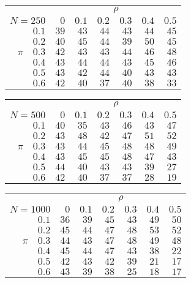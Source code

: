 \begin{tabular}{r|rrrrrr}
\hline\hline
 &\multicolumn{6}{c}{$\rho$} \\ 
 $N = 250$ & $0$ & $0.1$ & $0.2$ & $0.3$ & $0.4$ & $0.5$ \\ 
 \hline$0.1$ & $39$ & $43$ & $44$ & $43$ & $44$ & $45$\\ 
$0.2$ & $40$ & $45$ & $44$ & $39$ & $50$ & $45$\\ 
$\pi\quad$$0.3$ & $42$ & $43$ & $43$ & $44$ & $46$ & $48$\\ 
$0.4$ & $43$ & $44$ & $44$ & $43$ & $45$ & $46$\\ 
$0.5$ & $43$ & $42$ & $44$ & $40$ & $43$ & $43$\\ 
$0.6$ & $42$ & $40$ & $37$ & $40$ & $38$ & $33$\\ 
 \hline 
 \end{tabular}
 
 \vspace{2em} 
 
\begin{tabular}{r|rrrrrr}
\hline\hline
 &\multicolumn{6}{c}{$\rho$} \\ 
 $N = 500$ & $0$ & $0.1$ & $0.2$ & $0.3$ & $0.4$ & $0.5$ \\ 
 \hline$0.1$ & $40$ & $35$ & $43$ & $46$ & $43$ & $47$\\ 
$0.2$ & $43$ & $48$ & $42$ & $47$ & $51$ & $52$\\ 
$\pi\quad$$0.3$ & $43$ & $44$ & $45$ & $48$ & $48$ & $49$\\ 
$0.4$ & $43$ & $45$ & $45$ & $48$ & $47$ & $43$\\ 
$0.5$ & $44$ & $40$ & $43$ & $43$ & $39$ & $27$\\ 
$0.6$ & $42$ & $40$ & $37$ & $37$ & $28$ & $19$\\ 
 \hline 
 \end{tabular}
 
 \vspace{2em} 
 
\begin{tabular}{r|rrrrrr}
\hline\hline
 &\multicolumn{6}{c}{$\rho$} \\ 
 $N = 1000$ & $0$ & $0.1$ & $0.2$ & $0.3$ & $0.4$ & $0.5$ \\ 
 \hline$0.1$ & $36$ & $39$ & $45$ & $43$ & $49$ & $50$\\ 
$0.2$ & $45$ & $44$ & $47$ & $48$ & $53$ & $52$\\ 
$\pi\quad$$0.3$ & $44$ & $43$ & $47$ & $48$ & $49$ & $48$\\ 
$0.4$ & $45$ & $44$ & $47$ & $43$ & $38$ & $22$\\ 
$0.5$ & $42$ & $43$ & $42$ & $39$ & $21$ & $17$\\ 
$0.6$ & $43$ & $39$ & $38$ & $25$ & $18$ & $17$\\ 
 \hline 
 \end{tabular}